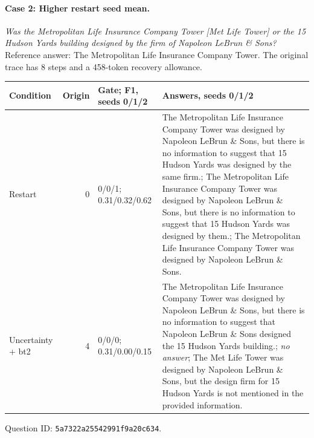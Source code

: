 \par\medskip\noindent\begin{minipage}{\linewidth}
\paragraph{Case 2: Higher restart seed mean.}
\textit{Was the Metropolitan Life Insurance Company Tower [Met Life Tower] or the 15 Hudson Yards building designed by the firm of Napoleon LeBrun \& Sons?} Reference answer: The Metropolitan Life Insurance Company Tower. The original trace has 8 steps and a 458-token recovery allowance.
\begin{center}\footnotesize
\begin{tabular}{@{}p{.20\linewidth}rp{.16\linewidth}p{.44\linewidth}@{}}
\toprule Condition & Origin & Gate; F1, seeds 0/1/2 & Answers, seeds 0/1/2 \\
\midrule
Restart & 0 & 0/0/1; 0.31/0.32/0.62 & The Metropolitan Life Insurance Company Tower was designed by Napoleon LeBrun \& Sons, but there is no information to suggest that 15 Hudson Yards was designed by the same firm.; The Metropolitan Life Insurance Company Tower was designed by Napoleon LeBrun \& Sons, but there is no information to suggest that 15 Hudson Yards was designed by them.; The Metropolitan Life Insurance Company Tower was designed by Napoleon LeBrun \& Sons. \\
Uncertainty + bt2 & 4 & 0/0/0; 0.31/0.00/0.15 & The Metropolitan Life Insurance Company Tower was designed by Napoleon LeBrun \& Sons, but there is no information to suggest that Napoleon LeBrun \& Sons designed the 15 Hudson Yards building.; \textit{no answer}; The Met Life Tower was designed by Napoleon LeBrun \& Sons, but the design firm for 15 Hudson Yards is not mentioned in the provided information. \\
\bottomrule\end{tabular}\end{center}
Question ID: \texttt{5a7322a25542991f9a20c634}.
\end{minipage}\par
